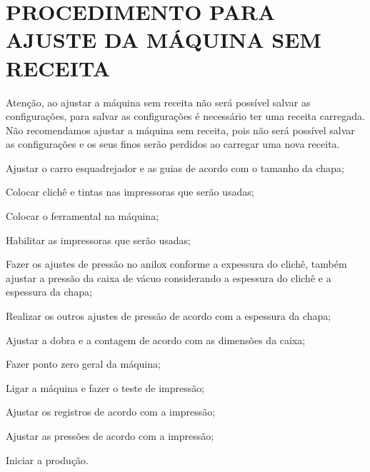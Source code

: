 \thispagestyle{fancy}

\vspace*{40 pt}

\section{\large{PROCEDIMENTO PARA AJUSTE DA MÁQUINA SEM RECEITA}}

Atenção, ao ajustar a máquina sem receita não será possível salvar as configurações, para salvar as configurações é necessário ter uma receita carregada.
Não recomendamos ajustar a máquina sem receita, pois não será possível salvar as configurações e os seus finos serão perdidos ao carregar uma nova receita.


\begin{procedureAdjustmentNoRecipe}
  \item Ajustar o carro esquadrejador e as guias de acordo com o tamanho da chapa;
  \item Colocar clichê e tintas nas impressoras que serão usadas;
  \item Colocar o ferramental na máquina;
  \item Habilitar as impressoras que serão usadas;
  \item Fazer os ajustes de pressão no anilox conforme a expessura do clichê, também ajustar a pressão da caixa de vácuo considerando a espessura do clichê e a 
  espessura da chapa;
  \item Realizar os outros ajustes de pressão de acordo com a espessura da chapa;
  \item Ajustar a dobra e a contagem de acordo com as dimensões da caixa;
  \item Fazer ponto zero geral da máquina;
  \item Ligar a máquina e fazer o teste de impressão;
  \item Ajustar os registros de acordo com a impressão;
  \item Ajustar as pressões de acordo com a impressão;
  \item Iniciar a produção.
  
\end{procedureAdjustmentNoRecipe}

